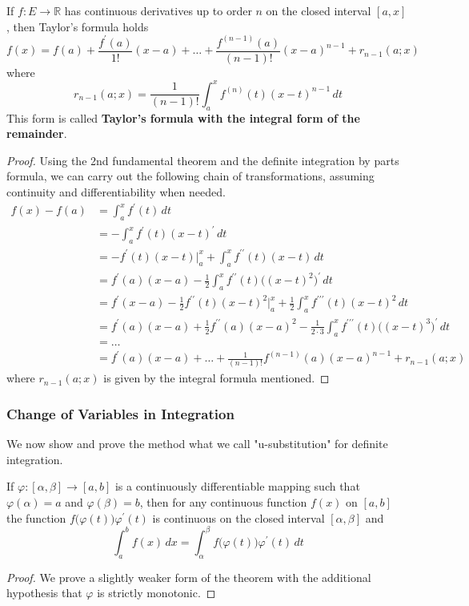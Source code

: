   \begin{theorem}
  If $f: E \longrightarrow \mathbb{R}$ has continuous derivatives up to order $n$ on the closed interval $[a, x]$, then Taylor's formula holds
  \[f(x) = f(a) + \frac{f^\prime (a)}{1!} (x - a) + \ldots + \frac{f^{(n-1)}(a)}{(n-1)!} (x - a)^{n-1} + r_{n-1}(a; x)\]
  where 
  \[r_{n-1} (a;x) = \frac{1}{(n-1)!} \int_a^x f^{(n)} (t) (x - t)^{n-1} \,dt\]
  This form is called \textbf{Taylor's formula with the integral form of the remainder}. 
  \end{theorem}
  \begin{proof}
  Using the 2nd fundamental theorem and the definite integration by parts formula, we can carry out the following chain of transformations, assuming continuity and differentiability when needed. 
  \begin{align*}
      f(x) - f(a) & = \int_a^x f^\prime (t) \,dt \\
      & = - \int_a^x f^\prime(t) (x - t)^\prime \,dt \\
      & = -f^\prime (t) (x - t)\big|_a^x + \int_a^x f^{\prime\prime} (t) (x - t) \,dt \\
      & = f^\prime (a) (x - a) - \frac{1}{2} \int_a^x f^{\prime\prime} (t) \big( (x - t)^2\big)^\prime \,dt \\
      & = f^\prime (x - a) - \frac{1}{2} f^{\prime\prime} (t) (x - t)^2 \big|_a^x + \frac{1}{2} \int_a^x f^{\prime\prime\prime} (t) (x - t)^2\,dt \\
      & = f^\prime(a) (x - a) + \frac{1}{2} f^{\prime\prime} (a) (x - a)^2 - \frac{1}{2 \cdot 3} \int_a^x f^{\prime\prime\prime} (t) \big((x - t)^3\big)^\prime\,dt \\
      & = \ldots \\
      & = f^\prime (a) (x - a) + \ldots + \frac{1}{(n-1)!} f^{(n-1)} (a)(x - a)^{n-1} + r_{n-1}(a;x)
  \end{align*}
  where $r_{n-1}(a;x)$ is given by the integral formula mentioned. 
  \end{proof}

  \subsubsection{Change of Variables in Integration}
  We now show and prove the method what we call "u-substitution" for definite integration. 

  \begin{theorem}
  If $\varphi: [\alpha, \beta] \longrightarrow [a, b]$ is a continuously differentiable mapping such that $\varphi(\alpha) = a$ and $\varphi(\beta) = b$, then for any continuous function $f(x)$ on $[a, b]$ the function $f\big(\varphi(t)\big) \varphi^\prime (t)$ is continuous on the closed interval $[\alpha, \beta]$ and 
  \[\int_a^b f(x)\,dx = \int_\alpha^\beta f\big(\varphi(t)\big) \varphi^\prime(t)\,dt\]
  \end{theorem}
  \begin{proof}
  We prove a slightly weaker form of the theorem with the additional hypothesis that $\varphi$ is strictly monotonic. 
  \end{proof}

